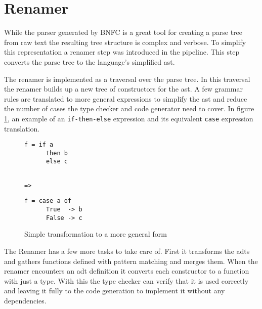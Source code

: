 \section{Renamer}

While the parser generated by BNFC is a great tool for creating a parse tree from raw text the resulting tree structure is complex and verbose. To simplify this representation a renamer step was introduced in the pipeline. This step converts the parse tree to the language's simplified \gls{ast}. 

The renamer is implemented as a traversal over the parse tree. In this traversal the renamer builds up a new tree of constructors for the \gls{ast}. A few grammar rules are translated to more general expressions to simplify the \gls{ast} and reduce the number of cases the type checker and code generator need to cover. In figure \ref{lst:renamer1}, an example of an \texttt{if-then-else} expression and its equivalent \texttt{case} expression translation.

\begin{figure}[ht]
\centering
{}%
\begin{minipage}[t]{0.30\linewidth}
    \centering
    \begin{lstlisting}
f = if a
      then b
      else c
    \end{lstlisting}
\end{minipage}
\begin{minipage}[t]{0.09\linewidth}
    \centering
    \begin{lstlisting}

=>
    \end{lstlisting}
\end{minipage}
\begin{minipage}[t]{0.30\linewidth}
    \centering
    \begin{lstlisting}
f = case a of
      True  -> b
      False -> c
    \end{lstlisting}
\end{minipage}
\caption{Simple transformation to a more general form}
\label{lst:renamer1}
\end{figure}

The Renamer has a few more tasks to take care of. First it transforms the \glspl{adt} and gathers functions defined with pattern matching and merges them. When the renamer encounters an \gls{adt} definition it converts each constructor to a function with just a type. With this the type checker can verify that it is used correctly and leaving it fully to the code generation to implement it without any dependencies.

